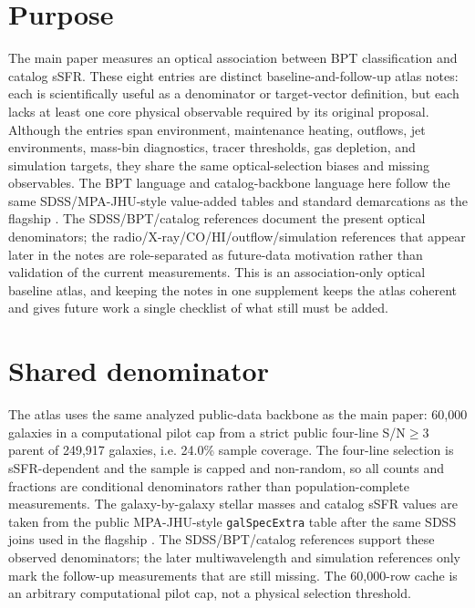 \documentclass[twocolumn]{aastex631}
\begin{document}
\section{Purpose}
The main paper measures an optical association between BPT classification and catalog sSFR. These eight entries are distinct baseline-and-follow-up atlas notes: each is scientifically useful as a denominator or target-vector definition, but each lacks at least one core physical observable required by its original proposal. Although the entries span environment, maintenance heating, outflows, jet environments, mass-bin diagnostics, tracer thresholds, gas depletion, and simulation targets, they share the same optical-selection biases and missing observables. The BPT language and catalog-backbone language here follow the same SDSS/MPA-JHU-style value-added tables and standard demarcations as the flagship \citep{sdssdr17,brinchmann2004,york2000,baldwin1981,kewley2001,kauffmann2003bpt,kewley2006,stasinska2008,stasinska2015}. The SDSS/BPT/catalog references document the present optical denominators; the radio/X-ray/CO/HI/outflow/simulation references that appear later in the notes are role-separated as future-data motivation rather than validation of the current measurements. This is an association-only optical baseline atlas, and keeping the notes in one supplement keeps the atlas coherent and gives future work a single checklist of what still must be added.

\section{Shared denominator}
The atlas uses the same analyzed public-data backbone as the main paper: 60,000 galaxies in a computational pilot cap from a strict public four-line S/N$\geq3$ parent of 249,917 galaxies, i.e. 24.0\% sample coverage. The four-line selection is sSFR-dependent and the sample is capped and non-random, so all counts and fractions are conditional denominators rather than population-complete measurements. The galaxy-by-galaxy stellar masses and catalog sSFR values are taken from the public MPA-JHU-style \texttt{galSpecExtra} table after the same SDSS joins used in the flagship \citep{sdssdr17,brinchmann2004,york2000}. The SDSS/BPT/catalog references support these observed denominators; the later multiwavelength and simulation references only mark the follow-up measurements that are still missing. The 60,000-row cache is an arbitrary computational pilot cap, not a physical selection threshold.
\end{document}
